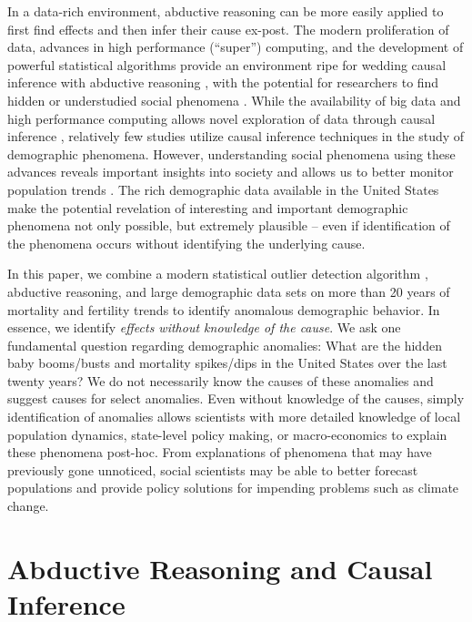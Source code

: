 \documentclass[12pt]{article}
\begin{document}
In a data-rich environment, abductive reasoning can be more easily
applied to first find effects and then infer their cause ex-post. The
modern proliferation of data, advances in high performance (``super'')
computing, and the development of powerful statistical algorithms
provide an environment ripe for wedding causal inference with abductive
reasoning \citep{van2016data, zikopoulos2011}, with the potential for
researchers to find hidden or understudied social phenomena
\citep{bohon2018demography}. While the availability of big data and high
performance computing allows novel exploration of data through causal
inference
\citep{bohon2018demography, rcausalimpact, shiffrin2016drawing},
relatively few studies utilize causal inference techniques in the study
of demographic phenomena. However, understanding social phenomena using
these advances reveals important insights into society
\citep{angrist1989lifetime, mas2009peers} and allows us to better
monitor population trends \citep{nobles2019, torche2015hidden}. The rich
demographic data available in the United States make the potential
revelation of interesting and important demographic phenomena not only
possible, but extremely plausible -- even if identification of the
phenomena occurs without identifying the underlying cause.

In this paper, we combine a modern statistical outlier detection
algorithm \citep{chen1993joint}, abductive reasoning, and large
demographic data sets on more than 20 years of mortality and fertility
trends to identify anomalous demographic behavior. In essence, we
identify \emph{effects without knowledge of the cause}. We ask one
fundamental question regarding demographic anomalies: What are the
hidden baby booms/busts and mortality spikes/dips in the United States
over the last twenty years? We do not necessarily know the causes of
these anomalies and suggest causes for select anomalies. Even without
knowledge of the causes, simply identification of anomalies allows
scientists with more detailed knowledge of local population dynamics,
state-level policy making, or macro-economics to explain these phenomena
post-hoc. From explanations of phenomena that may have previously gone
unnoticed, social scientists may be able to better forecast populations
and provide policy solutions for impending problems such as climate
change.

\hypertarget{abductive-reasoning-and-causal-inference}{%
\section{Abductive Reasoning and Causal
Inference}\label{abductive-reasoning-and-causal-inference}}
\end{document}
